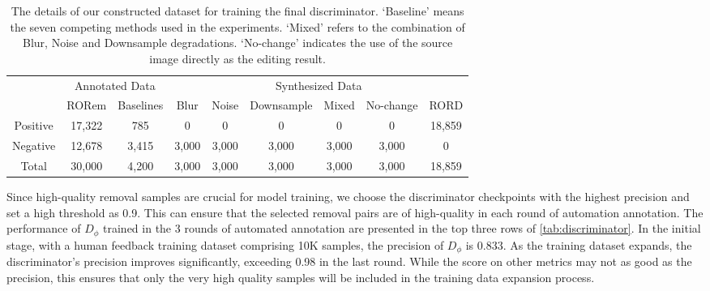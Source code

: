 \documentclass[10pt,twocolumn,letterpaper]{article}
\begin{document}
\begin{table}[t]
  \centering
  \begin{tabular}{@{}ccccccccc@{}}
    \toprule
     & \multicolumn{2}{c}{Annotated Data} & \multicolumn{6}{c}{Synthesized Data}\\
     \cmidrule(r){2-3} \cmidrule(l){4-9} 
     & RORem & Baselines & Blur & Noise & Downsample & Mixed & No-change & RORD \\
    \midrule
    Positive & 17,322 & 785 & 0 & 0 & 0 & 0 &0 & 18,859  \\
    Negative & 12,678 & 3,415 & 3,000 & 3,000 & 3,000 & 3,000 & 3,000 & 0  \\
    \midrule
    Total & 30,000 & 4,200 & 3,000 & 3,000 & 3,000 & 3,000 & 3,000 & 18,859  \\
    \bottomrule
  \end{tabular}
\vspace{-1mm}
  \caption{The details of our constructed dataset for training the final discriminator. `Baseline' means the seven competing methods used in the experiments. `Mixed' refers to the combination of Blur, Noise and Downsample degradations. `No-change' indicates the use of the source image directly as the editing result.}
  \label{tab:enhanceData}
  \vspace{-3mm}
\end{table}

Since high-quality removal samples are crucial for model training, we choose the discriminator checkpoints with the highest precision and set a high threshold as 0.9. This can ensure that the selected removal pairs are of high-quality in each round of automation annotation. The performance of  $ D_{\phi} $ trained in the 3 rounds of automated annotation are presented in the top three rows of \cref{tab:discriminator}. In the initial stage, with a human feedback training dataset comprising 10K samples, the precision of $D_{\phi}$ is 0.833. As the training dataset expands, the discriminator's precision improves significantly, exceeding 0.98 in the last round. While the score on other metrics may not as good as the precision, this ensures that only the very high quality samples will be included in the training data expansion process. 
\end{document}
